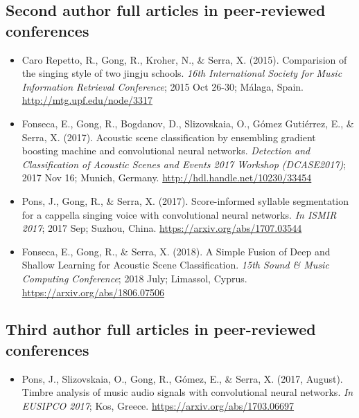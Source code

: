 \subsection*{Second author full articles in peer-reviewed conferences}
\begin{itemize}[leftmargin=*]
	\item Caro Repetto, R., Gong, R., Kroher, N., \& Serra, X. (2015). Comparision of the singing style of two jingju schools. \textit{16th International Society for Music Information Retrieval Conference}; 2015 Oct 26-30; Málaga, Spain. \newline \url{http://mtg.upf.edu/node/3317}
	\item Fonseca, E., Gong, R., Bogdanov, D., Slizovskaia, O., Gómez Gutiérrez, E., \& Serra, X. (2017). Acoustic scene classification by ensembling gradient boosting machine and convolutional neural networks. \textit{Detection and Classification of Acoustic Scenes and Events 2017 Workshop (DCASE2017)}; 2017 Nov 16; Munich, Germany. \newline \url{http://hdl.handle.net/10230/33454}
	\item Pons, J., Gong, R., \& Serra, X. (2017). Score-informed syllable segmentation for a cappella singing voice with convolutional neural networks. \textit{In ISMIR 2017}; 2017 Sep; Suzhou, China. \newline \url{https://arxiv.org/abs/1707.03544}
	\item Fonseca, E., Gong, R., \& Serra, X. (2018). A Simple Fusion of Deep and Shallow Learning for Acoustic Scene Classification. \textit{15th Sound \& Music Computing Conference}; 2018 July; Limassol, Cyprus. \newline \url{https://arxiv.org/abs/1806.07506}
\end{itemize}

\subsection*{Third author full articles in peer-reviewed conferences}
\begin{itemize}[leftmargin=*]
	\item Pons, J., Slizovskaia, O., Gong, R., Gómez, E., \& Serra, X. (2017, August). Timbre analysis of music audio signals with convolutional neural networks. \textit{In EUSIPCO 2017}; Kos, Greece. \newline \url{https://arxiv.org/abs/1703.06697}
\end{itemize}


